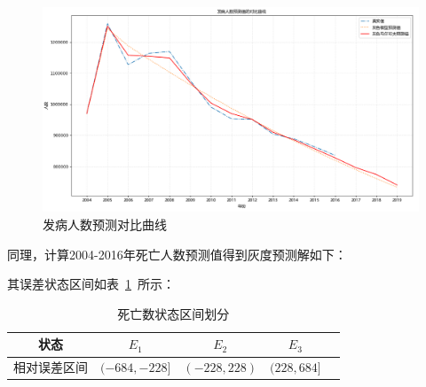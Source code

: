 \documentclass{whutmod}
\begin{document}
    \begin{figure}[H]
	\centering
	\includegraphics[width=\textwidth]{figures/f.png}
	\caption{发病人数预测对比曲线}\label{afd}
\end{figure}
	  同理，计算2004-2016年死亡人数预测值得到灰度预测解如下：


	  
%
%	  

	  其误差状态区间如表~\ref{ss}~所示：
	    \begin{table}[H]
	  	\centering\caption{死亡数状态区间划分}\label{ss}
	  	\begin{tabular}{ccccc}
	  		\toprule[2pt]
	  		\multicolumn{1}{m{3cm}}{\centering 状态}
	  		& \multicolumn{1}{m{2cm}}{\centering $E_{1}$}
	  		& \multicolumn{1}{m{2cm}}{\centering $E_{2}$}
	  		& \multicolumn{1}{m{2cm}}{\centering $E_{3}$}
	  		\\
	  		\midrule[1pt]
	  		相对误差区间 &  $(-684,-228]$  &$(-228,228)$ & $(228,684]$   \\ 
	  		\bottomrule[2pt]	
	  	\end{tabular}
	  \end{table}
	  
\end{document}
